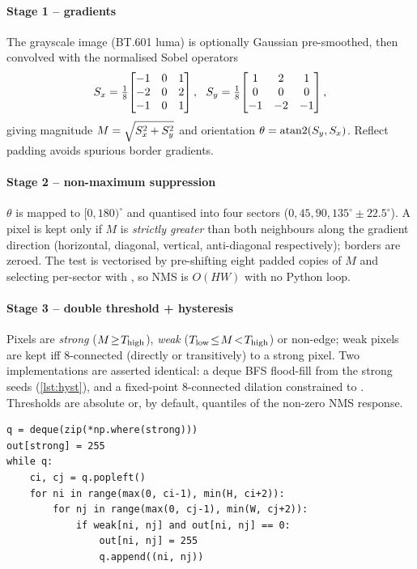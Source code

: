 \paragraph{Stage 1 -- gradients}
The grayscale image (BT.601 luma) is optionally Gaussian pre-smoothed, then
convolved with the normalised Sobel operators
\begin{equation}
  \Sx=\tfrac{1}{8}\!\begin{bmatrix}-1&0&1\\-2&0&2\\-1&0&1\end{bmatrix},\ \
  \Sy=\tfrac{1}{8}\!\begin{bmatrix}1&2&1\\0&0&0\\-1&-2&-1\end{bmatrix},
\end{equation}
giving magnitude $M=\sqrt{S_x^2+S_y^2}$ and orientation
$\theta=\operatorname{atan2}(S_y,S_x)$. Reflect padding avoids spurious border
gradients.

\paragraph{Stage 2 -- non-maximum suppression}
$\theta$ is mapped to $[0,180)^{\circ}$ and quantised into four sectors
($0,45,90,135^{\circ}\!\pm\!22.5^{\circ}$). A pixel is kept only if $M$ is
\emph{strictly greater} than both neighbours along the gradient direction
(horizontal, diagonal, vertical, anti-diagonal respectively); borders are
zeroed. The test is vectorised by pre-shifting eight padded copies of $M$ and
selecting per-sector with \code{np.select}, so NMS is $O(HW)$ with no Python
loop.

\paragraph{Stage 3 -- double threshold + hysteresis}
Pixels are \emph{strong} ($M\!\ge\!T_{\text{high}}$), \emph{weak}
($T_{\text{low}}\!\le\!M\!<\!T_{\text{high}}$) or non-edge; weak pixels are kept iff 8-connected
(directly or transitively) to a strong pixel. Two implementations are asserted
identical: a deque BFS flood-fill from the strong
seeds\ifdefined\SUPPLEMENTARY{} (\cref{lst:hyst})\fi, and a fixed-point
8-connected dilation constrained to \code{strong|weak}. Thresholds are absolute
or, by default, quantiles of the non-zero NMS response.

\ifdefined\SUPPLEMENTARY
\begin{lstlisting}[caption={8-connected hysteresis (BFS core).},label=lst:hyst,float=t]
q = deque(zip(*np.where(strong)))
out[strong] = 255
while q:
    ci, cj = q.popleft()
    for ni in range(max(0, ci-1), min(H, ci+2)):
        for nj in range(max(0, cj-1), min(W, cj+2)):
            if weak[ni, nj] and out[ni, nj] == 0:
                out[ni, nj] = 255
                q.append((ni, nj))
\end{lstlisting}
\fi

